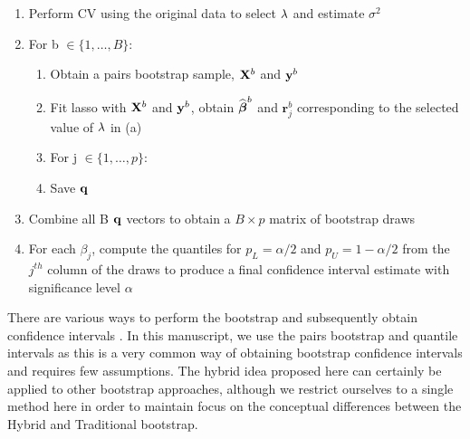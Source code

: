 \begin{enumerate}
\item Perform CV using the original data to select $\lambda$ and estimate $\sigma^2$
\item For b $\in \lbrace 1, \ldots, B \rbrace$:
\begin{enumerate}
\item Obtain a pairs bootstrap sample, $\mathbf{X}^b$ and $\mathbf{y}^b$
\item Fit lasso with $\mathbf{X}^b$ and $\mathbf{y}^b$, obtain $\widehat{\boldsymbol{\beta}}^b$ and $\boldsymbol{r}_j^b$ corresponding to the selected value of $\lambda$ in (a)
\item For j $\in \lbrace 1, \ldots, p \rbrace$:
	\begin{algorithmic}
    \EndCase
    \EndCase
	\EndSwitch
	\end{algorithmic}
\item Save $\mathbf{q}$
\end{enumerate}
\item Combine all B $\mathbf{q}$ vectors to obtain a $B \times p$ matrix of bootstrap draws
\item For each $\beta_j$, compute the quantiles for $p_L = \alpha/2$ and $p_U = 1 - \alpha/2$ from the $j^{th}$ column of the draws to produce a final confidence interval estimate with significance level $\alpha$
\end{enumerate}

There are various ways to perform the bootstrap and subsequently obtain confidence intervals \citep{Efron1994}. In this manuscript, we use the pairs bootstrap and quantile intervals as this is a very common way of obtaining bootstrap confidence intervals and requires few assumptions. The hybrid idea proposed here can certainly be applied to other bootstrap approaches, although we restrict ourselves to a single method here in order to maintain focus on the conceptual differences between the Hybrid and Traditional bootstrap.

